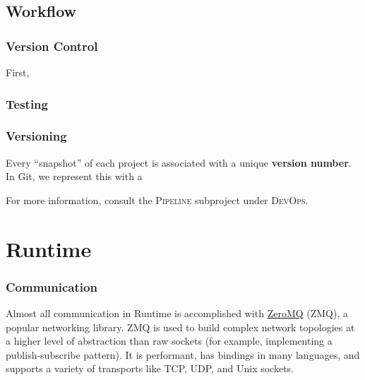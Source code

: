 \documentclass[12pt]{book}
\begin{document}
  \section{Workflow}

  \subsection{Version Control}

  First,

  \subsection{Testing}

  \subsection{Versioning}

  Every ``snapshot'' of each project is associated with a unique \textbf{version number}.
  In Git, we represent this with a

  For more information, consult the \textsc{Pipeline} subproject under \textsc{DevOps}.

  \chapter{Runtime}

  \subsection{Communication}

  Almost all communication in Runtime is accomplished with \href{https://zeromq.org/}{ZeroMQ} (ZMQ), a popular networking library.
  ZMQ is used to build complex network topologies at a higher level of abstraction than raw sockets (for example, implementing a publish-subscribe pattern).
  It is performant, has bindings in many languages, and supports a variety of transports like TCP, UDP, and Unix sockets.


\end{document}

